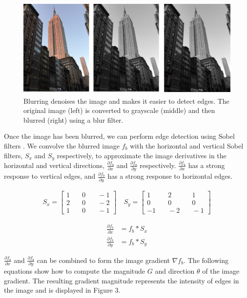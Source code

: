 \documentclass{article}
\begin{document}
\begin{figure}[h!]
\centering
\includegraphics[height=5cm]{images/blur.png}
\caption{Blurring denoises the image and makes it easier to detect edges. The original image (left) is converted to grayscale (middle) and then blurred (right) using a blur filter.}
\label{fig:example}
\end{figure}

Once the image has been blurred, we can perform edge detection using Sobel filters \cite{sobel}. We convolve the blurred image $f_b$ with the horizontal and vertical Sobel filters, $S_x$ and $S_y$ respectively, to approximate the image derivatives in the horizontal and vertical directions, $\frac{\partial f_b}{\partial x}$ and $\frac{\partial f_b}{\partial y}$ respectively. $\frac{\partial f_b}{\partial x}$ has a strong response to vertical edges, and $\frac{\partial f_b}{\partial y}$ has a strong response to horizontal edges.

\begin{align}
S_x = \begin{bmatrix} 
1 & \quad 0 & \quad -1 \\ 
2 & \quad 0 & \quad -2 \\ 
1 & \quad 0 & \quad -1  
\end{bmatrix}
\quad S_y = \begin{bmatrix} 
1 & \quad 2 & \quad 1 \\ 
0 & \quad 0 & \quad 0 \\ 
-1 & \quad -2 & \quad -1  
\end{bmatrix}
\end{align}

\begin{align}
\frac{\partial f_b}{\partial x} &= f_b * S_x \\
\frac{\partial f_b}{\partial y} &= f_b * S_y
\end{align}

$\frac{\partial f_b}{\partial x}$ and $\frac{\partial f_b}{\partial y}$ can be combined to form the image gradient $\nabla f_b$. The following equations show how to compute the magnitude $G$ and direction $\theta$ of the image gradient. The resulting gradient magnitude represents the intensity of edges in the image and is displayed in Figure 3. 
\end{document}
